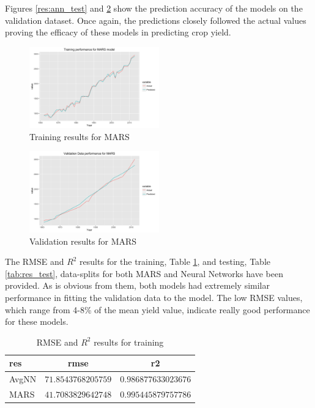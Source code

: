 \documentclass[conference]{IEEEtran}
\begin{document}
Figures \ref{res:ann_test} and \ref{res:mars_test} show the prediction accuracy of the models on the validation dataset. Once again, the predictions closely followed the actual values proving the efficacy of these models in predicting crop yield.
\begin{figure}[!h]
    \centering
    \includegraphics[width=0.5\textwidth]{mars_training.png}
    \caption{Training results for MARS}
    \label{res:mars_train}
\end{figure}
\begin{figure}[!h]
    \centering
    \includegraphics[width=0.5\textwidth]{mars_validate.png}
    \caption{Validation results for MARS}
    \label{res:mars_test}
\end{figure}
The RMSE and $R^2$ results for the training, Table \ref{tab:res_train}, and testing, Table \ref{tab:res_test}, data-splits for both MARS and Neural Networks have been provided. As is obvious from them, both models had extremely similar performance in fitting the validation data to the model. The low RMSE values, which range from 4-8\% of the mean yield value, indicate really good performance for these models. 
\begin{table}[!tbp]
\begin{center}
\begin{tabular}{lrr}
\hline\hline
\multicolumn{1}{l}{res}&\multicolumn{1}{c}{rmse}&\multicolumn{1}{c}{r2}\tabularnewline
\hline
AvgNN&$71.8543768205759$&$0.986877633023676$\tabularnewline
MARS&$41.7083829642748$&$0.995445879757786$\tabularnewline
\hline
\end{tabular}\end{center}
\caption{RMSE and $R^2$ results for training}
\label{tab:res_train}
\end{table} 
\end{document}
